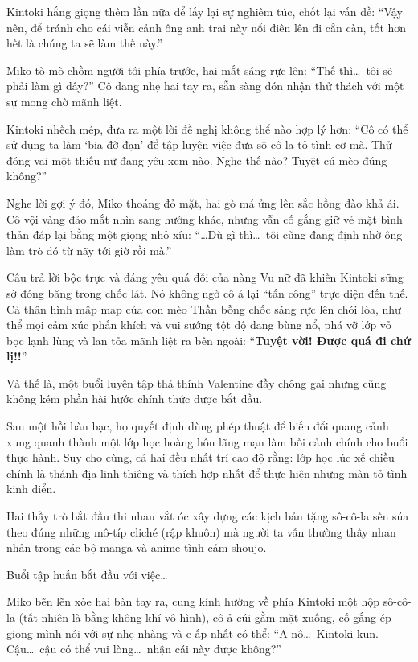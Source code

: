 \documentclass[../main.tex]{subfiles}
\begin{document}
Kintoki hắng giọng thêm lần nữa để lấy lại sự nghiêm túc, chốt lại vấn đề: ``Vậy nên, để tránh cho cái viễn cảnh ông anh trai này nổi điên lên đi cắn càn, tốt hơn hết là chúng ta sẽ làm thế này.''

Miko tò mò chồm người tới phía trước, hai mắt sáng rực lên: ``Thế thì\dots\ tôi sẽ phải làm gì đây?'' Cô dang nhẹ hai tay ra, sẵn sàng đón nhận thử thách với một sự mong chờ mãnh liệt.

Kintoki nhếch mép, đưa ra một lời đề nghị không thể nào hợp lý hơn: ``Cô có thể sử dụng ta làm `bia đỡ đạn' để tập luyện việc đưa sô-cô-la tỏ tình cơ mà. Thử đóng vai một thiếu nữ đang yêu xem nào. Nghe thế nào? Tuyệt cú mèo đúng không?''

Nghe lời gợi ý đó, Miko thoáng đỏ mặt, hai gò má ửng lên sắc hồng đào khả ái. Cô vội vàng đảo mắt nhìn sang hướng khác, nhưng vẫn cố gắng giữ vẻ mặt bình thản đáp lại bằng một giọng nhỏ xíu: ``\dots Dù gì thì\dots\ tôi cũng đang định nhờ ông làm trò đó từ nãy tới giờ rồi mà.''

Câu trả lời bộc trực và đáng yêu quá đỗi của nàng Vu nữ đã khiến Kintoki sững sờ đóng băng trong chốc lát. Nó không ngờ cô ả lại ``tấn công'' trực diện đến thế. Cả thân hình mập mạp của con mèo Thần bỗng chốc sáng rực lên chói lòa, như thể mọi cảm xúc phấn khích và vui sướng tột độ đang bùng nổ, phá vỡ lớp vỏ bọc lạnh lùng và lan tỏa mãnh liệt ra bên ngoài: ``\textbf{Tuyệt vời! Được quá đi chứ lị!!}''


Và thế là, một buổi luyện tập thả thính Valentine đầy chông gai nhưng cũng không kém phần hài hước chính thức được bắt đầu.

\ct

Sau một hồi bàn bạc, họ quyết định dùng phép thuật để biến đổi quang cảnh xung quanh thành một lớp học hoàng hôn lãng mạn làm bối cảnh chính cho buổi thực hành. Suy cho cùng, cả hai đều nhất trí cao độ rằng: lớp học lúc xế chiều chính là thánh địa linh thiêng và thích hợp nhất để thực hiện những màn tỏ tình kinh điển.

Hai thầy trò bắt đầu thi nhau vắt óc xây dựng các kịch bản tặng sô-cô-la sến súa theo đúng những mô-típ cliché (rập khuôn) mà người ta vẫn thường thấy nhan nhản trong các bộ manga và anime tình cảm shoujo.

Buổi tập huấn bắt đầu với việc\dots

\il

Miko bẽn lẽn xòe hai bàn tay ra, cung kính hướng về phía Kintoki một hộp sô-cô-la (tất nhiên là bằng không khí vô hình), cô ả cúi gằm mặt xuống, cố gắng ép giọng mình nói với sự nhẹ nhàng và e ấp nhất có thể: ``A-nô\dots\ Kintoki-kun. Cậu\dots\ cậu có thể vui lòng\dots\ nhận cái này được không?''
\end{document}
